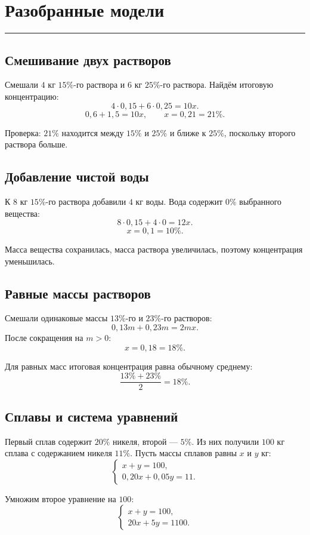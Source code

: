 \documentclass[a4paper,12pt]{article}
\newcommand{\sectionline}{%
  \par\vspace{2pt}
  {\color{accent}\rule{\linewidth}{0.7pt}}
  \vspace{4pt}
}
\begin{document}
\section{Разобранные модели}
\sectionline

\subsection{Смешивание двух растворов}

Смешали $4$ кг $15\%$-го раствора и $6$ кг $25\%$-го раствора.
Найдём итоговую концентрацию:
\[
  4\cdot0{,}15+6\cdot0{,}25=10x.
\]
\[
  0{,}6+1{,}5=10x,
  \qquad x=0{,}21=21\%.
\]

Проверка: $21\%$ находится между $15\%$ и $25\%$ и ближе к $25\%$,
поскольку второго раствора больше.

\subsection{Добавление чистой воды}

К $8$ кг $15\%$-го раствора добавили $4$ кг воды. Вода содержит
$0\%$ выбранного вещества:
\[
  8\cdot0{,}15+4\cdot0=12x.
\]
\[
  x=0{,}1=10\%.
\]

Масса вещества сохранилась, масса раствора увеличилась, поэтому концентрация
уменьшилась.

\subsection{Равные массы растворов}

Смешали одинаковые массы $13\%$-го и $23\%$-го растворов:
\[
  0{,}13m+0{,}23m=2mx.
\]
После сокращения на $m>0$:
\[
  x=0{,}18=18\%.
\]

Для равных масс итоговая концентрация равна обычному среднему:
\[
  \frac{13\%+23\%}{2}=18\%.
\]

\subsection{Сплавы и система уравнений}

Первый сплав содержит $20\%$ никеля, второй --- $5\%$. Из них получили
$100$ кг сплава с содержанием никеля $11\%$. Пусть массы сплавов равны
$x$ и $y$ кг:
\[
  \begin{cases}
    x+y=100,\\
    0{,}20x+0{,}05y=11.
  \end{cases}
\]

Умножим второе уравнение на $100$:
\[
  \begin{cases}
    x+y=100,\\
    20x+5y=1100.
  \end{cases}
\]
\end{document}
